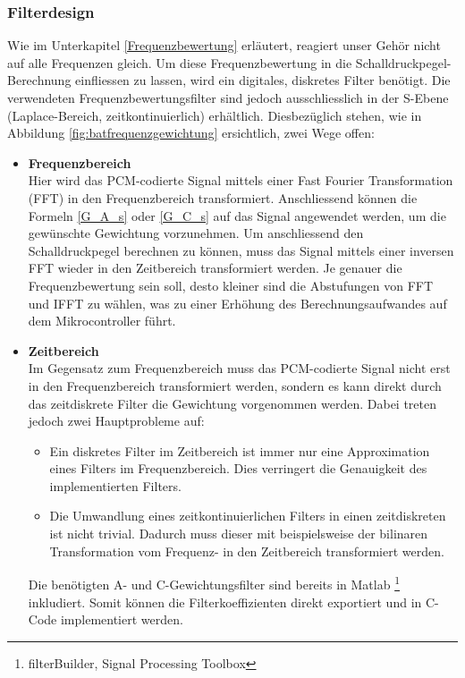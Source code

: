 \documentclass[12pt]{article}
\begin{document}
	\subsubsection*{Filterdesign}
	Wie im Unterkapitel \ref{Frequenzbewertung} erläutert, reagiert unser Gehör nicht auf alle Frequenzen gleich. Um diese Frequenzbewertung in die Schalldruckpegel-Berechnung einfliessen zu lassen, wird ein digitales, diskretes Filter benötigt. Die verwendeten Frequenzbewertungsfilter sind jedoch ausschliesslich in der S-Ebene (Laplace-Bereich, zeitkontinuierlich) erhältlich. Diesbezüglich stehen, wie in Abbildung \ref{fig:batfrequenzgewichtung} ersichtlich, zwei Wege offen:
	\begin{itemize}
		\item \textbf{Frequenzbereich} \\
		Hier wird das PCM-codierte Signal mittels einer Fast Fourier Transformation (FFT) in den Frequenzbereich transformiert. Anschliessend können die Formeln \ref{G_A_s} oder \ref{G_C_s} auf das Signal angewendet werden, um die gewünschte Gewichtung vorzunehmen. Um anschliessend den Schalldruckpegel berechnen zu können, muss das Signal mittels einer inversen FFT wieder in den Zeitbereich transformiert werden. Je genauer die Frequenzbewertung sein soll, desto kleiner sind die Abstufungen von FFT und IFFT zu wählen, was zu einer Erhöhung des Berechnungsaufwandes auf dem Mikrocontroller führt.
		\item \textbf{Zeitbereich} \\
		Im Gegensatz zum Frequenzbereich muss das PCM-codierte Signal nicht erst in den Frequenzbereich transformiert werden, sondern es kann direkt durch das zeitdiskrete Filter die Gewichtung vorgenommen werden. Dabei treten jedoch zwei Hauptprobleme auf: 
		\begin{itemize}
			\item Ein diskretes Filter im Zeitbereich ist immer nur eine Approximation eines Filters im Frequenzbereich. Dies verringert die Genauig\-keit des implementierten Filters. 
			\item Die Umwandlung eines zeitkontinuierlichen Filters in einen zeitdiskreten ist nicht trivial. Dadurch muss dieser mit beispielsweise der bilinaren Transformation \cite{oppenheim_alan_v_zeitdiskrete_1989} vom Frequenz- in den Zeitbereich transformiert werden. 
		\end{itemize} Die benötigten A- und C-Gewichtungsfilter sind bereits in Matlab \footnote{filterBuilder, Signal Processing Toolbox} inkludiert. Somit können die Filterkoeffizienten direkt exportiert und in C-Code implementiert werden.
	\end{itemize}
\end{document}
